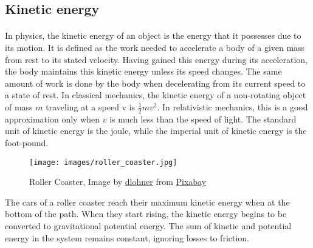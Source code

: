 \documentclass{book}
\begin{document}
    \begin{landscape}
    \section{Kinetic energy}
    \label{sec:kinetic}
    \paragraph{}
    In physics, the kinetic energy of an object is the energy that it possesses due to its motion.\cite{jain2009textbook} It is defined as the work needed to accelerate a body of a given mass from rest to its stated velocity. Having gained this energy during its acceleration, the body maintains this kinetic energy unless its speed changes. The same amount of work is done by the body when decelerating from its current speed to a state of rest. In classical mechanics, the kinetic energy of a non-rotating object of mass $m$ traveling at a speed v is $\frac{1}{2} m v^2$. In relativistic mechanics, this is a good approximation only when $v$ is much less than the speed of light. The standard unit of kinetic energy is the joule, while the imperial unit of kinetic energy is the foot-pound.
    
    \begin{figure}[h]
    	\centering
        \texttt{[image: images/roller\_coaster.jpg]}
        \caption{Roller Coaster, Image by \href{https://pixabay.com/users/dlohner-4631193/?utm_source=link-attribution&amp;utm_medium=referral&amp;utm_campaign=image&amp;utm_content=3100041}{dlohner} from \href{https://pixabay.com/?utm_source=link-attribution&amp;utm_medium=referral&amp;utm_campaign=image&amp;utm_content=3100041}{Pixabay}}
    \end{figure}
    
    The cars of a roller coaster reach their maximum kinetic energy when at the bottom of the path. When they start rising, the kinetic energy begins to be converted to gravitational potential energy. The sum of kinetic and potential energy in the system remains constant, ignoring losses to friction.
    \end{landscape}

    
    

    \printindex
\end{document}
